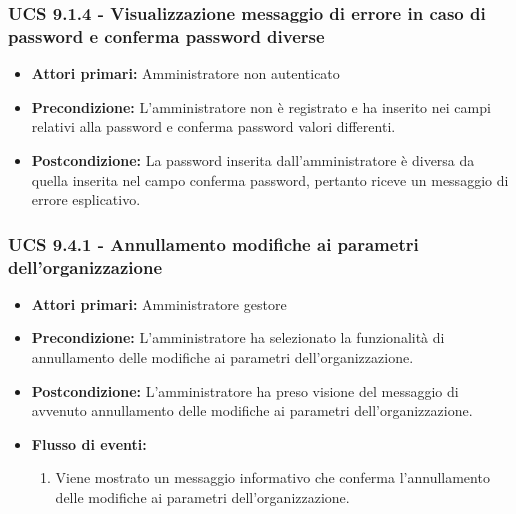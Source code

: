\subsubsection{UCS 9.1.4 - Visualizzazione messaggio di errore in caso di password e conferma password diverse}%
\begin{itemize}
\item \textbf{Attori primari:} Amministratore non autenticato
\item \textbf{Precondizione:} L'amministratore non è registrato e ha inserito nei campi relativi alla password e conferma password valori differenti.
\item \textbf{Postcondizione:} La password inserita dall'amministratore è diversa da quella inserita nel campo conferma password, pertanto riceve un messaggio di errore esplicativo.
\end{itemize}

\subsubsection{UCS 9.4.1 - Annullamento modifiche ai parametri dell'organizzazione}%
\begin{itemize}
\item \textbf{Attori primari:} Amministratore gestore
\item \textbf{Precondizione:} L'amministratore ha selezionato la funzionalità di annullamento delle modifiche ai parametri dell'organizzazione.
\item \textbf{Postcondizione:} L'amministratore ha preso visione del messaggio di avvenuto annullamento delle modifiche ai parametri dell'organizzazione.
\item \textbf{Flusso di eventi:}
    \begin{enumerate}
        \item Viene mostrato un messaggio informativo che conferma l'annullamento delle modifiche ai parametri dell'organizzazione.
    \end{enumerate} 
\end{itemize}

